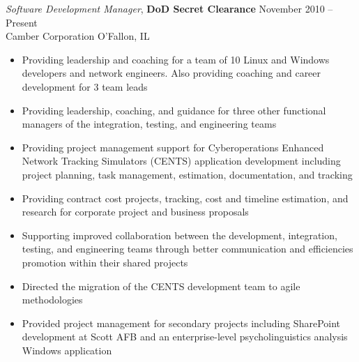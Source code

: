 \documentclass[margin,line]{resume}
\begin{document}
\begin{resume}
{\sl Software Development Manager}, \textbf{\small DoD Secret Clearance} \hfill November 2010 -- Present\\
Camber Corporation                                                       \hfill O'Fallon, IL
\begin{itemize} \itemsep -2pt %
\small\item Providing leadership and coaching for a team of 10 Linux and Windows developers and network engineers.  Also providing coaching and career development for 3 team leads
\small\item Providing leadership, coaching, and guidance for three other functional managers of the integration, testing, and engineering teams
\small\item Providing project management support for Cyberoperations Enhanced Network Tracking Simulators (CENTS) application development including project planning, task management, estimation, documentation, and tracking
\small\item Providing contract cost projects, tracking, cost and timeline estimation, and research for corporate project and business proposals
\small\item Supporting improved collaboration between the development, integration, testing, and engineering teams through better communication and efficiencies promotion within their shared projects
\small\item Directed the migration of the CENTS development team to agile methodologies
\small\item Provided project management for secondary projects including SharePoint development at Scott AFB and an enterprise-level psycholinguistics analysis Windows application
\end{itemize}


\end{resume}
\end{document}
